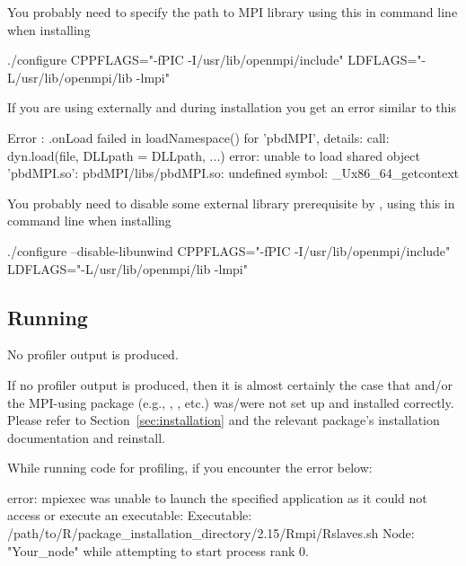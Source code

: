 \begin{solution}
You probably need to specify the path to MPI library
using this in command line when installing 
\begin{Output}
./configure CPPFLAGS="-fPIC -I/usr/lib/openmpi/include" LDFLAGS="-L/usr/lib/openmpi/lib -lmpi"
\end{Output}  
\end{solution}


\begin{problem}
If you are using  externally
and during 
installation you get an error similar to this
\begin{Output}
Error : .onLoad failed in loadNamespace() for 'pbdMPI', details:
  call: dyn.load(file, DLLpath = DLLpath, ...)
  error: unable to load shared object 'pbdMPI.so':
  pbdMPI/libs/pbdMPI.so: undefined symbol: _Ux86_64_getcontext
\end{Output}
\end{problem}
  
\begin{solution}
You probably need to disable some external library
prerequisite by ,
using this in command line when installing 
\begin{Code}
./configure --disable-libunwind CPPFLAGS="-fPIC -I/usr/lib/openmpi/include" LDFLAGS="-L/usr/lib/openmpi/lib -lmpi"
\end{Code}  
\end{solution}


\subsection{Running}

\begin{problem}
No profiler output is produced.
\end{problem}

\begin{solution}
If no profiler output is produced, then it is almost certainly the case that 
 and/or the MPI-using  package (e.g., , 
, etc.) was/were not set up and installed correctly.  Please refer to 
Section~\ref{sec:installation} and the relevant package's installation 
documentation and reinstall.
\end{solution}



\begin{problem}
While running  code for profiling, if you
encounter the error below:
\begin{Output}
error: mpiexec was unable to launch the specified application as it could not access
or execute an executable:
Executable: /path/to/R/package_installation_directory/2.15/Rmpi/Rslaves.sh
Node: "Your_node"
while attempting to start process rank 0.
\end{Output} 
\end{problem}

